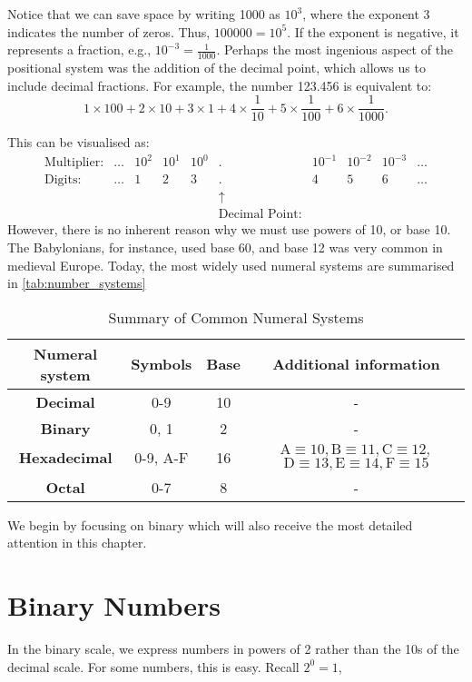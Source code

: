 Notice that we can save space by writing 1000 as \(10^3\), where the exponent 3 indicates the number of zeros. Thus, \(100000 = 10^5\). If the exponent is negative, it represents a fraction, e.g., \(10^{-3} = \frac{1}{1000}\). Perhaps the most ingenious aspect of the positional system was the addition of the decimal point, which allows us to include decimal fractions. For example, the number 123.456 is equivalent to:
\[
1 \times 100 + 2 \times 10 + 3 \times 1 + 4 \times \frac{1}{10} + 5 \times \frac{1}{100} + 6 \times \frac{1}{1000}.
\]

This can be visualised as:
\[
\begin{array}{rccccccccc}
\text{Multiplier:} & \ldots & 10^2 & 10^1 & 10^0 & . & 10^{-1} & 10^{-2} & 10^{-3} & \ldots \\
\text{Digits:} & \ldots & 1 & 2 & 3 & . & 4 & 5 & 6 &\ldots \\
& & & & & \uparrow & & & & \\
& & & & & \text{Decimal Point:} & & & &
\end{array}
\]
However, there is no inherent reason why we must use powers of 10, or base 10. The Babylonians, for instance, used base 60, and base 12 was very common in medieval Europe. Today, the most widely used numeral systems are summarised in \autoref{tab:number_systems}

\begin{table}[ht]
\centering
\renewcommand{\arraystretch}{1.4}
\begin{tabular}{|c|c|c|c|}
\hline
\textbf{Numeral system} & \textbf{Symbols} & \textbf{Base} & \textbf{Additional information} \\ \hline
\textbf{Decimal} & 0-9 & 10 & - \\ \hline
\textbf{Binary} & 0, 1 & 2 & - \\ \hline
\textbf{Hexadecimal} & 0-9, A-F & 16 & $\mathrm{A} \equiv 10, \mathrm{B} \equiv 11, \mathrm{C} \equiv 12,$ $\mathrm{D} \equiv 13, \mathrm{E} \equiv 14, \mathrm{F} \equiv 15$ \\ \hline
\textbf{Octal} & 0-7 & 8 & - \\ \hline
\end{tabular}
\caption{Summary of Common Numeral Systems}
\label{tab:number_systems}
\end{table}

We begin by focusing on binary which will also receive the most detailed attention in this chapter.

\section{Binary Numbers}
In the binary scale, we express numbers in powers of 2 rather than the 10s of the decimal scale. For some numbers, this is easy. Recall $2^0=1$,

